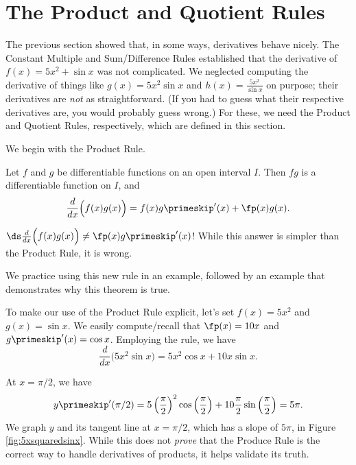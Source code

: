 \section{The Product and Quotient Rules}\label{sec:prod_quot_rules}

The previous section showed that, in some ways, derivatives behave nicely. The Constant Multiple and Sum/Difference Rules established that the derivative of $f(x) = 5x^2+\sin x $ was not complicated. We neglected computing the derivative of things like $g(x) = 5x^2\sin x$ and $h(x) = \frac{5x^2}{\sin x}$ on purpose; their derivatives are \textit{not} as straightforward. (If you had to guess what their respective derivatives are, you would probably guess wrong.) For these, we need the Product and Quotient Rules, respectively, which are defined in this section. 

We begin with the Product Rule.

{Let $f$ and $g$ be differentiable functions on an open interval $I$. Then $fg$ is a differentiable function on $I$, and $$\frac{d}{dx}\Big(f(x)g(x)\Big) = f(x)g\primeskip'(x) + \fp(x)g(x).$$}

 $\ds\frac{d}{dx}\Big(f(x)g(x)\Big) \neq \fp(x)g\primeskip'(x)$! While this answer is simpler than the Product Rule, it is wrong. 

We practice using this new rule in an example, followed by an example that demonstrates why this theorem is true.\\

{To make our use of the Product Rule explicit, let's set $f(x) = 5x^2$ and $g(x) = \sin x$. We easily compute/recall that $\fp(x) = 10x$ and $g\primeskip'(x) = \cos x$. Employing the rule, we have $$\frac{d}{dx}\Big(5x^2\sin x\Big) = 5x^2\cos x + 10x\sin x.$$

At $x=\pi/2$, we have $$y\primeskip'(\pi/2) = 5\left(\frac{\pi}{2}\right)^2\cos \left(\frac{\pi}2\right) + 10\frac{\pi}2 \sin\left(\frac{\pi}{2}\right) = 5\pi.$$ We graph $y$ and its tangent line at $x=\pi/2$, which has a slope of $5\pi$, in Figure \ref{fig:5xsquaredsinx}. While this does not \textit{prove} that the Produce Rule is the correct way to handle derivatives of products, it helps validate its truth.
}\\

